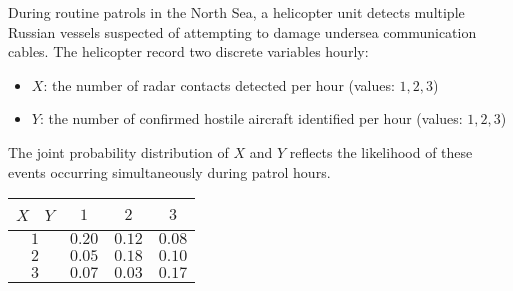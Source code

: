 \begin{enquestion}{15}{
    During routine patrols in the North Sea, a helicopter unit detects multiple Russian vessels suspected of attempting to damage undersea communication cables.
    The helicopter record two discrete variables hourly:
    \begin{itemize}
        \item $X$: the number of radar contacts detected per hour (values: $1, 2, 3$)
        \item $Y$: the number of confirmed hostile aircraft identified per hour (values: $1, 2, 3$)
    \end{itemize}
    The joint probability distribution of $X$ and $Y$ reflects the likelihood of these events occurring simultaneously during patrol hours.
    \begin{center}
        \begin{tabular}{c|ccc}
            \toprule
                {$X$ \ $Y$} &  $1$ & $2$ & $3$ \\
            \midrule 
                $1$ & $0.20$ & $0.12$ & $0.08$ \\
                $2$ & $0.05$ & $0.18$ & $0.10$ \\
                $3$ & $0.07$ & $0.03$ & $0.17$ \\
            \bottomrule
        \end{tabular}
    \end{center}
}

\end{enquestion}
